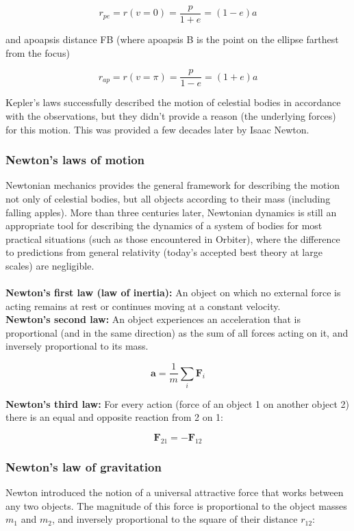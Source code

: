\documentclass[Orbiter User Manual.tex]{subfiles}
\begin{document}
\[ r_{pe} = r(v=0) = \frac{p}{1 + e} = (1 - e) a \]

\noindent
and apoapsis distance FB (where apoapsis B is the point on the ellipse farthest from the focus)

\[ r_{ap} = r(v=\pi) = \frac{p}{1 - e} = (1 + e) a \]

\noindent
Kepler’s laws successfully described the motion of celestial bodies in accordance with the observations, but they didn’t provide a reason (the underlying forces) for this motion. This was provided a few decades later by Isaac Newton.

\subsubsection{Newton’s laws of motion}
Newtonian mechanics provides the general framework for describing the motion not only of celestial bodies, but all objects according to their mass (including falling apples). More than three centuries later, Newtonian dynamics is still an appropriate tool for describing the dynamics of a system of bodies for most practical situations (such as those encountered in Orbiter), where the difference to predictions from general relativity (today’s accepted best theory at large scales) are negligible.\\
\\
\textbf{Newton’s first law (law of inertia):} An object on which no external force is acting remains at rest or continues moving at a constant velocity.\\
\textbf{Newton’s second law:} An object experiences an acceleration that is proportional (and in the same direction) as the sum of all forces acting on it, and inversely proportional to its mass.

\[ \textbf{a} = \frac{1}{m} \sum_{i} \textbf{F}_{i} \]

\noindent
\textbf{Newton’s third law:} For every action (force of an object 1 on another object 2) there is an equal and opposite reaction from 2 on 1:

\[ \textbf{F}_{21} = - \textbf{F}_{12} \]

\subsubsection{Newton’s law of gravitation}
Newton introduced the notion of a universal attractive force that works between any two objects. The magnitude of this force is proportional to the object masses $m_{1}$ and $m_{2}$, and inversely proportional to the square of their distance $r_{12}$:
\end{document}
